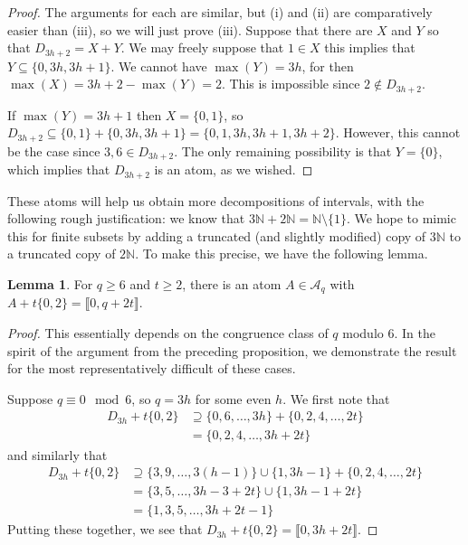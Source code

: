 \documentclass{report}
\newcommand{\A}{\mathcal{A}}
\newcommand{\NN}{\mathbb{N}}
\newcommand{\llb}{\llbracket}
\newcommand{\rrb}{\rrbracket}
\renewcommand{\:}{\text{:}}
\theoremstyle{definition}
\newtheorem{lemma}[defn]{Lemma}
\begin{document}
\begin{proof}
	The arguments for each are similar, but (i) and (ii) are comparatively easier than (iii), so we will just prove (iii).
	Suppose that there are $X$ and $Y$ so that $D_{3h+2} = X + Y$.
	We may freely suppose that $1\in X$ this implies that $Y \subseteq \{0,3h,3h+1\}$.
	We cannot have $\max(Y) = 3h$, for then $\max(X) = 3h+2 - \max(Y) = 2$.
	This is impossible since $2\notin D_{3h+2}$.
	
	If $\max(Y) = 3h+1$ then $X = \{0,1\}$, so $D_{3h+2} \subseteq \{0,1\} + \{0,3h,3h+1\} = \{0,1,3h,3h+1,3h+2\}$.
	However, this cannot be the case since $3,6\in D_{3h+2}$.
	The only remaining possibility is that $Y = \{0\}$, which implies that $D_{3h+2}$ is an atom, as we wished.
\end{proof}

These atoms will help us obtain more decompositions of intervals, with the following rough justification: we know that $3\NN + 2\NN = \NN \setminus\{1\}$. 
We hope to mimic this for finite subsets by adding a truncated (and slightly modified) copy of $3\NN$ to a truncated copy of $2\NN$.
To make this precise, we have the following lemma.

\begin{lemma} \label{lemma:many 2s types}
	For $q \ge 6$ and $t\ge 2$, there is an atom $A\in \A_q$ with $A + t\{0,2\} = \llb 0, q+2t \rrb$.
\end{lemma}

\begin{proof}
	This essentially depends on the congruence class of $q$ modulo $6$.
	In the spirit of the argument from the preceding proposition, we demonstrate the result for the most representatively difficult of these cases.
	
	Suppose $q \equiv 0 \mod 6$, so $q = 3h$ for some even $h$.
	We first note that
	\begin{align*}
	D_{3h} + t\{0,2\} 
	&\supseteq \{0,6,\dots, 3h\} + \{0,2,4,\dots, 2t\} \\
	& = \{0,2,4,\dots, 3h+2t \}
	\end{align*}
	and similarly that
	\begin{align*}
	D_{3h} + t\{0,2\}
	&\supseteq \{3,9,\dots, 3(h-1) \}\cup\{1,3h-1\} + \{0,2,4,\dots, 2t \} \\
	&= \{3,5,\dots, 3h-3 + 2t \}\cup \{1,3h-1 + 2t \} \\
	&= \{1,3,5,\dots, 3h+2t-1 \}
	\end{align*}
	Putting these together, we see that $D_{3h} + t\{0,2\} = \llb 0,3h+2t \rrb$.
\end{proof}
\end{document}
